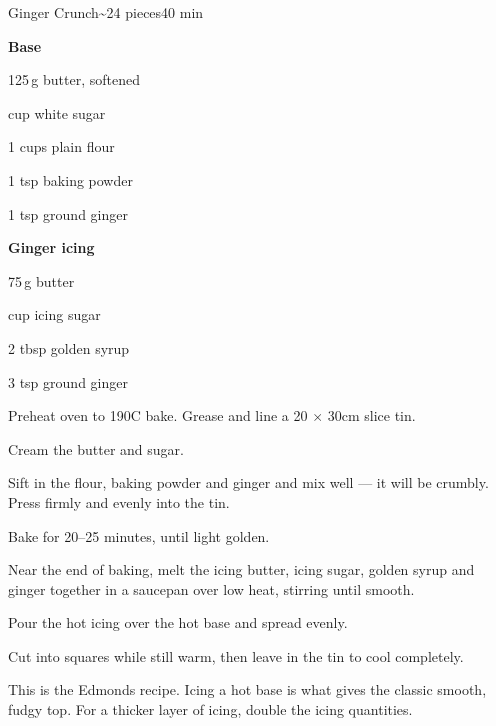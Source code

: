\begin{recipebox}{Ginger Crunch}{\textasciitilde24 pieces}{40 min}
\begin{ingredients}
  \item[] \textbf{Base}
  \item 125\,g butter, softened
  \item {} cup white sugar
  \item 1 cups plain flour
  \item 1 tsp baking powder
  \item 1 tsp ground ginger
  \item[] \textbf{Ginger icing}
  \item 75\,g butter
  \item {} cup icing sugar
  \item 2 tbsp golden syrup
  \item 3 tsp ground ginger
\end{ingredients}

\begin{method}
  \item Preheat oven to 190\degree C bake. Grease and line a 20 $\times$ 30cm slice tin.
  \item Cream the butter and sugar.
  \item Sift in the flour, baking powder and ginger and mix well --- it will be crumbly. Press firmly and evenly into the tin.
  \item Bake for 20--25 minutes, until light golden.
  \item Near the end of baking, melt the icing butter, icing sugar, golden syrup and ginger together in a saucepan over low heat, stirring until smooth.
  \item Pour the hot icing over the hot base and spread evenly.
  \item Cut into squares while still warm, then leave in the tin to cool completely.
\end{method}

\begin{notes}
This is the Edmonds recipe. Icing a hot base is what gives the classic smooth, fudgy top. For a thicker layer of icing, double the icing quantities.
\end{notes}
\end{recipebox}
